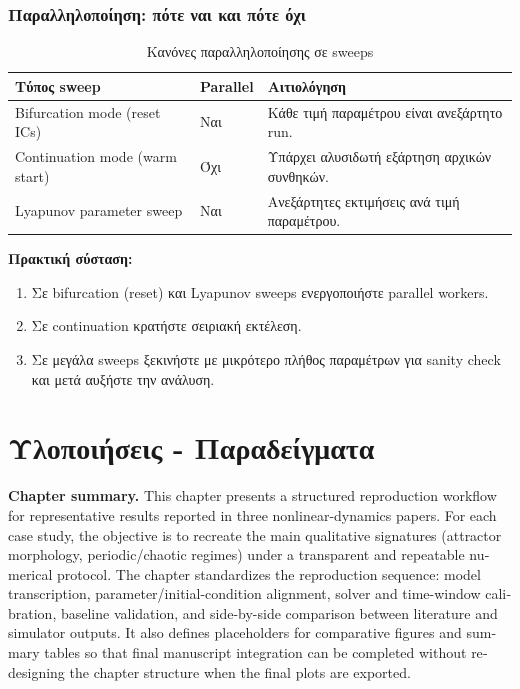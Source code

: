 \documentclass[11pt,a4paper]{report}
\begin{document}
\subsection{Παραλληλοποίηση: πότε ναι και πότε όχι}

\begin{table}[H]
\centering
\caption{Κανόνες παραλληλοποίησης σε sweeps}
\label{tab:ch2-parallel-rules}
\renewcommand{\arraystretch}{1.15}
\begin{tabular}{|p{}|p{}|p{}|}
\hline
\textbf{Τύπος sweep} & \textbf{Parallel} & \textbf{Αιτιολόγηση} \\
\hline
Bifurcation mode (reset ICs) & Ναι & Κάθε τιμή παραμέτρου είναι ανεξάρτητο run. \\
\hline
Continuation mode (warm start) & Όχι & Υπάρχει αλυσιδωτή εξάρτηση αρχικών συνθηκών. \\
\hline
Lyapunov parameter sweep & Ναι & Ανεξάρτητες εκτιμήσεις ανά τιμή παραμέτρου. \\
\hline
\end{tabular}
\end{table}

\begin{guidebox}
\textbf{Πρακτική σύσταση:}
\begin{enumerate}
\item Σε bifurcation (reset) και Lyapunov sweeps ενεργοποιήστε parallel workers.
\item Σε continuation κρατήστε σειριακή εκτέλεση.
\item Σε μεγάλα sweeps ξεκινήστε με μικρότερο πλήθος παραμέτρων για sanity check και μετά αυξήστε την ανάλυση.
\end{enumerate}
\end{guidebox}


\chapter{Υλοποιήσεις - Παραδείγματα}
\label{ch:implementations-examples}

\noindent\textbf{Chapter summary.}
\textenglish{This chapter presents a structured reproduction workflow for representative results reported in three nonlinear-dynamics papers. For each case study, the objective is to recreate the main qualitative signatures (attractor morphology, periodic/chaotic regimes) under a transparent and repeatable numerical protocol. The chapter standardizes the reproduction sequence: model transcription, parameter/initial-condition alignment, solver and time-window calibration, baseline validation, and side-by-side comparison between literature and simulator outputs. It also defines placeholders for comparative figures and summary tables so that final manuscript integration can be completed without redesigning the chapter structure when the final plots are exported.}
\end{document}
